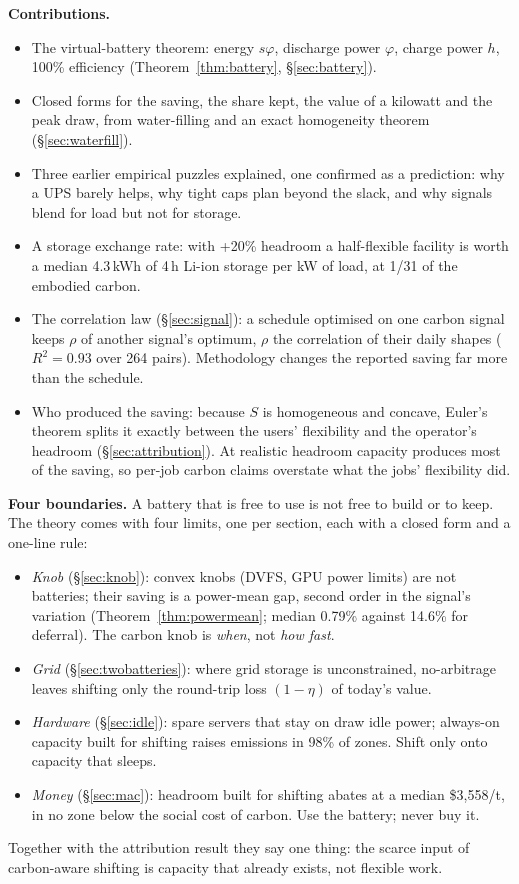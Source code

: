 \documentclass[acmsmall,review,anonymous]{acmart}
\theoremstyle{definition}
\begin{document}
\textbf{Contributions.}
\begin{itemize}
\item The virtual-battery theorem: energy $s\varphi$, discharge power $\varphi$, charge power $h$,
  100\% efficiency (Theorem~\ref{thm:battery}, \S\ref{sec:battery}).
\item Closed forms for the saving, the share kept, the value of a kilowatt and the peak draw, from
  water-filling and an exact homogeneity theorem (\S\ref{sec:waterfill}).
\item Three earlier empirical puzzles explained, one confirmed as a prediction: why a UPS barely
  helps, why tight caps plan beyond the slack, and why signals blend for load but not for storage.
\item A storage exchange rate: with +20\% headroom a half-flexible facility is worth a median
  4.3\,kWh of 4\,h Li-ion storage per kW of load, at 1/31 of the embodied carbon.
\item The correlation law (\S\ref{sec:signal}): a schedule optimised on one carbon signal keeps
  $\rho$ of another signal's optimum, $\rho$ the correlation of their daily shapes
  ($R^2=0.93$ over 264 pairs). Methodology changes the reported saving far more than the schedule.
\item Who produced the saving: because $S$ is homogeneous and concave, Euler's theorem splits it
  exactly between the users' flexibility and the operator's headroom (\S\ref{sec:attribution}).
  At realistic headroom capacity produces most of the saving, so per-job carbon claims overstate
  what the jobs' flexibility did.
\end{itemize}

\textbf{Four boundaries.} A battery that is free to use is not free to build or to keep. The
theory comes with four limits, one per section, each with a closed form and a one-line rule:
\begin{itemize}
\item \emph{Knob} (\S\ref{sec:knob}): convex knobs (DVFS, GPU power limits) are not batteries;
  their saving is a power-mean gap, second order in the signal's variation
  (Theorem~\ref{thm:powermean}; median 0.79\% against 14.6\% for deferral). The carbon knob is
  \emph{when}, not \emph{how fast}.
\item \emph{Grid} (\S\ref{sec:twobatteries}): where grid storage is unconstrained, no-arbitrage
  leaves shifting only the round-trip loss $(1-\eta)$ of today's value.
\item \emph{Hardware} (\S\ref{sec:idle}): spare servers that stay on draw idle power; always-on
  capacity built for shifting raises emissions in 98\% of zones. Shift only onto capacity that sleeps.
\item \emph{Money} (\S\ref{sec:mac}): headroom built for shifting abates at a median \$3{,}558/t,
  in no zone below the social cost of carbon. Use the battery; never buy it.
\end{itemize}
Together with the attribution result they say one thing: the scarce input of carbon-aware
shifting is capacity that already exists, not flexible work.
\end{document}
